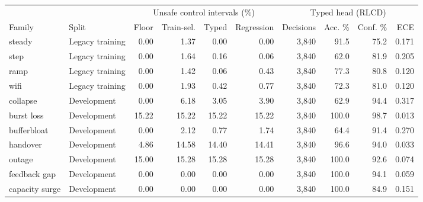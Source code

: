 \begin{tabular}{llrrrrrrrr}
\toprule
 & & \multicolumn{4}{c}{Unsafe control intervals (\%)} & \multicolumn{4}{c}{Typed head (RLCD)} \\
Family & Split & Floor & Train-sel. & Typed & Regression & Decisions & Acc. \% & Conf. \% & ECE \\
\midrule
steady & Legacy training & 0.00 & 1.37 & 0.00 & 0.00 & 3{,}840 & 91.5 & 75.2 & 0.171 \\
step & Legacy training & 0.00 & 1.64 & 0.16 & 0.06 & 3{,}840 & 62.0 & 81.9 & 0.205 \\
ramp & Legacy training & 0.00 & 1.42 & 0.06 & 0.43 & 3{,}840 & 77.3 & 80.8 & 0.120 \\
wifi & Legacy training & 0.00 & 1.93 & 0.42 & 0.77 & 3{,}840 & 72.3 & 81.0 & 0.120 \\
collapse & Development & 0.00 & 6.18 & 3.05 & 3.90 & 3{,}840 & 62.9 & 94.4 & 0.317 \\
burst loss & Development & 15.22 & 15.22 & 15.22 & 15.22 & 3{,}840 & 100.0 & 98.7 & 0.013 \\
bufferbloat & Development & 0.00 & 2.12 & 0.77 & 1.74 & 3{,}840 & 64.4 & 91.4 & 0.270 \\
handover & Development & 4.86 & 14.58 & 14.40 & 14.41 & 3{,}840 & 96.6 & 94.0 & 0.033 \\
outage & Development & 15.00 & 15.28 & 15.28 & 15.28 & 3{,}840 & 100.0 & 92.6 & 0.074 \\
feedback gap & Development & 0.00 & 0.00 & 0.00 & 0.00 & 3{,}840 & 100.0 & 94.1 & 0.059 \\
capacity surge & Development & 0.00 & 0.00 & 0.00 & 0.00 & 3{,}840 & 100.0 & 84.9 & 0.151 \\
\bottomrule
\end{tabular}
